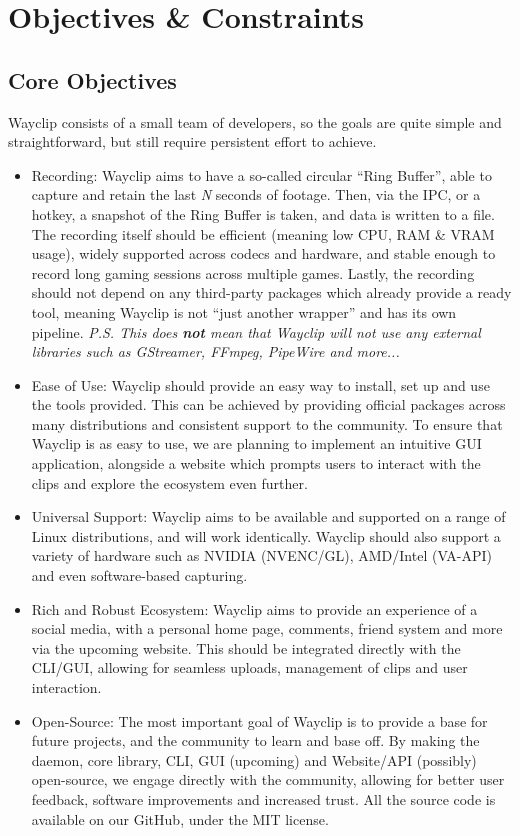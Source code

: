 \chapter{Objectives \& Constraints}

\section{Core Objectives}

Wayclip consists of a small team of developers, so the goals are quite simple and straightforward, but still require persistent effort to achieve.

\begin{itemize}
	\item Recording: Wayclip aims to have a so-called circular ``Ring Buffer'', able to capture and retain the last \emph{N} seconds of footage.
	      Then, via the IPC, or a hotkey, a snapshot of the Ring Buffer is taken, and data is written to a file.
	      The recording itself should be efficient (meaning low CPU, RAM \& VRAM usage), widely supported across codecs and hardware, and stable enough to record long gaming sessions across multiple games.
	      Lastly, the recording should not depend on any third-party packages which already provide a ready tool, meaning Wayclip is not ``just another wrapper'' and has its own pipeline.
	      \emph{P.S. This does \textbf{not} mean that Wayclip will not use any external libraries such as GStreamer, FFmpeg, PipeWire and more...}
	\item Ease of Use: Wayclip should provide an easy way to install, set up and use the tools provided. This can be achieved by providing official packages across many distributions and consistent support to the community.
	      To ensure that Wayclip is as easy to use, we are planning to implement an intuitive GUI application, alongside a website which prompts users to interact with the clips and explore the ecosystem even further.
	\item Universal Support: Wayclip aims to be available and supported on a range of Linux distributions, and will work identically. Wayclip should also support a variety of hardware such as NVIDIA (NVENC/GL), AMD/Intel (VA-API) and even software-based capturing.
	\item Rich and Robust Ecosystem: Wayclip aims to provide an experience of a social media, with a personal home page, comments, friend system and more via the upcoming website.
	      This should be integrated directly with the CLI/GUI, allowing for seamless uploads, management of clips and user interaction.
	\item Open-Source: The most important goal of Wayclip is to provide a base for future projects, and the community to learn and base off.
	      By making the daemon, core library, CLI, GUI (upcoming) and Website/API (possibly) open-source, we engage directly with the community, allowing for better user feedback, software improvements and increased trust.
	      All the source code is available on our GitHub, under the MIT license.
\end{itemize}


